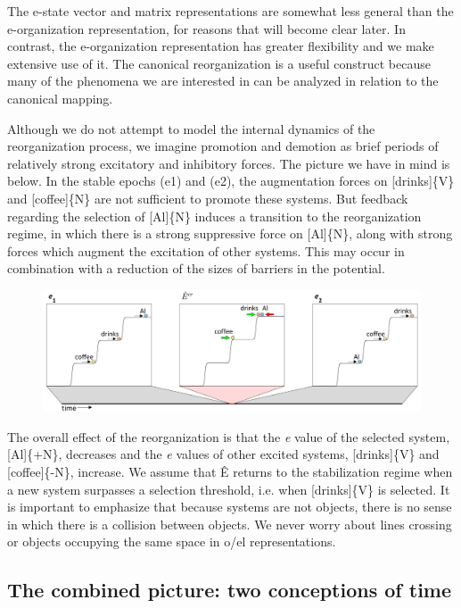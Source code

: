   The e-state vector and matrix representations are somewhat less general than the e-organization representation, for reasons that will become clear later. In contrast, the e-organization representation has greater flexibility and we make extensive use of it. The canonical reorganization is a useful construct because many of the phenomena we are interested in can be analyzed in relation to the canonical mapping.

  Although we do not attempt to model the internal dynamics of the reorganization process, we imagine promotion and demotion as brief periods of relatively strong excitatory and inhibitory forces. The picture we have in mind is below. In the stable epochs (e1) and (e2), the augmentation forces on [drinks]\{V\} and [coffee]\{N\} are not sufficient to promote these systems. But feedback regarding the selection of [Al]\{N\} induces a transition to the reorganization regime, in which there is a strong suppressive force on [Al]\{N\}, along with strong forces which augment the excitation of other systems. This may occur in combination with a reduction of the sizes of barriers in the potential. 

  
\begin{figure}
\includegraphics[width=\textwidth]{figures/Tilsen-img26.png}
\caption{\missingcaption}
\label{fig:2:19}
\end{figure}
 

  The overall effect of the reorganization is that the \textit{e} value of the selected system, [Al]\{+N\}, decreases and the \textit{e} values of other excited systems, [drinks]\{V\} and [coffee]\{-N\}, increase. We assume that Ê returns to the stabilization regime when a new system surpasses a selection threshold, i.e. when [drinks]\{V\} is selected. It is important to emphasize that because systems are not objects, there is no sense in which there is a collision between objects. We never worry about lines crossing or objects occupying the same space in o/el representations.

\subsection{The combined picture: two conceptions of time}

